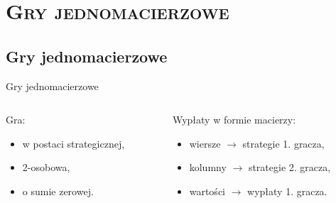 \documentclass[xcolor=x11names,compress]{beamer}
\renewcommand{\(}{\begin{columns}}
\renewcommand{\)}{\end{columns}}
\newcommand{\<}[1]{\begin{column}{#1}}
\renewcommand{\>}{\end{column}}
\begin{document}
\section{\scshape Gry jednomacierzowe}

\subsection{Gry jednomacierzowe}
\begin{frame}{Gry jednomacierzowe}
\begin{columns}[c]
\begin{column}{.5\textwidth}
Gra:
\begin{itemize}
\item w postaci strategicznej,
\item 2-osobowa,
\item o sumie zerowej.
\end{itemize}
\end{column}
\begin{column}{.5\textwidth}
Wypłaty w formie macierzy:
\begin{itemize}
\item wiersze $\rightarrow$ strategie 1. gracza,
\item kolumny $\rightarrow$ strategie 2. gracza,
\item wartości $\rightarrow$ wypłaty 1. gracza.
\end{itemize} 
\end{column}
\end{columns}
\end{frame}

\end{document}
